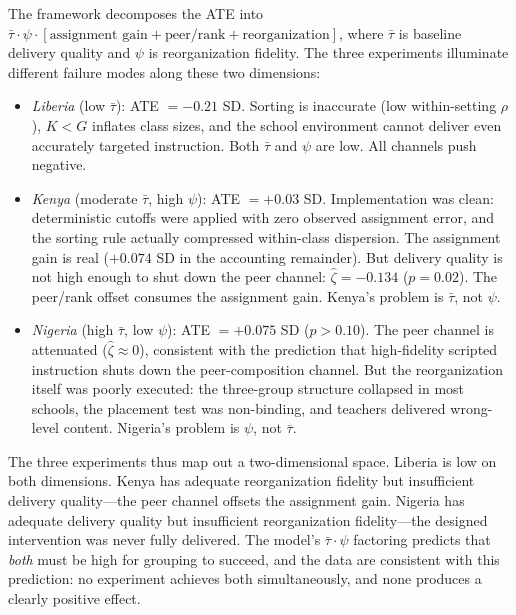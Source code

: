 \documentclass[11pt]{article}
\begin{document}
The framework decomposes the ATE into $\bar{\tau} \cdot \psi \cdot [\text{assignment gain} + \text{peer/rank} + \text{reorganization}]$, where $\bar{\tau}$ is baseline delivery quality and $\psi$ is reorganization fidelity. The three experiments illuminate different failure modes along these two dimensions:

\begin{itemize}
\item \emph{Liberia} (low $\bar{\tau}$): ATE $= -0.21$ SD. Sorting is inaccurate (low within-setting $\rho$), $K < G$ inflates class sizes, and the school environment cannot deliver even accurately targeted instruction. Both $\bar{\tau}$ and $\psi$ are low. All channels push negative.

\item \emph{Kenya} (moderate $\bar{\tau}$, high $\psi$): ATE $= +0.03$ SD. Implementation was clean: deterministic cutoffs were applied with zero observed assignment error, and the sorting rule actually compressed within-class dispersion. The assignment gain is real ($+0.074$ SD in the accounting remainder). But delivery quality is not high enough to shut down the peer channel: $\hat{\zeta} = -0.134$ ($p = 0.02$). The peer/rank offset consumes the assignment gain. Kenya's problem is $\bar{\tau}$, not $\psi$.

\item \emph{Nigeria} (high $\bar{\tau}$, low $\psi$): ATE $= +0.075$ SD ($p > 0.10$). The peer channel is attenuated ($\hat{\zeta} \approx 0$), consistent with the prediction that high-fidelity scripted instruction shuts down the peer-composition channel. But the reorganization itself was poorly executed: the three-group structure collapsed in most schools, the placement test was non-binding, and teachers delivered wrong-level content. Nigeria's problem is $\psi$, not $\bar{\tau}$.
\end{itemize}

The three experiments thus map out a two-dimensional space. Liberia is low on both dimensions. Kenya has adequate reorganization fidelity but insufficient delivery quality---the peer channel offsets the assignment gain. Nigeria has adequate delivery quality but insufficient reorganization fidelity---the designed intervention was never fully delivered. The model's $\bar{\tau} \cdot \psi$ factoring predicts that \emph{both} must be high for grouping to succeed, and the data are consistent with this prediction: no experiment achieves both simultaneously, and none produces a clearly positive effect.
\end{document}
